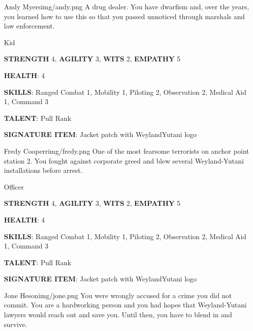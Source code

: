 
\begin{rpg-pcbox}{Andy Myers}{img/andy.png}
    A drug dealer. You have dwarfism and, over the years, you learned how to use this so that you passed unnoticed through marshals and law enforcement. 
\end{rpg-pcbox}

\begin{rpg-commentbox}{}
    Kid

    \textbf{STRENGTH} 4, \textbf{AGILITY} 3, \textbf{WITS} 2, \textbf{EMPATHY} 5

    \textbf{HEALTH}: 4

    \textbf{SKILLS}: Ranged Combat 1, Mobility 1, Piloting 2, Observation 2, Medical Aid 1, Command 3
    
    \textbf{TALENT}: Pull Rank
    
    \textbf{SIGNATURE ITEM}: Jacket patch with WeylandYutani logo    
\end{rpg-commentbox}

\newsect

\medskip \medskip \medskip \medskip \medskip \medskip \medskip \medskip \medskip \medskip \medskip \medskip \medskip \medskip \medskip \medskip \medskip \medskip

\begin{rpg-pcbox}{Fredy Cooperr}{img/fredy.png}
    One of the most fearsome terrorists on anchor point station 2. You fought against corporate greed and blew several Weyland-Yutani installations before arrest. 
\end{rpg-pcbox}

\begin{rpg-commentbox}{}
    Officer

    \textbf{STRENGTH} 4, \textbf{AGILITY} 3, \textbf{WITS} 2, \textbf{EMPATHY} 5

    \textbf{HEALTH}: 4

    \textbf{SKILLS}: Ranged Combat 1, Mobility 1, Piloting 2, Observation 2, Medical Aid 1, Command 3
    
    \textbf{TALENT}: Pull Rank
    
    \textbf{SIGNATURE ITEM}: Jacket patch with WeylandYutani logo    
\end{rpg-commentbox}

\newsect

\begin{rpg-pcbox}{Jone Heson}{img/jone.png}
    You were wrongly accused for a crime you did not commit. You are a hardworking person and you had hopes that Weyland-Yutani lawyers would reach out and save you. Until then, you have to blend in and survive.
\end{rpg-pcbox}

